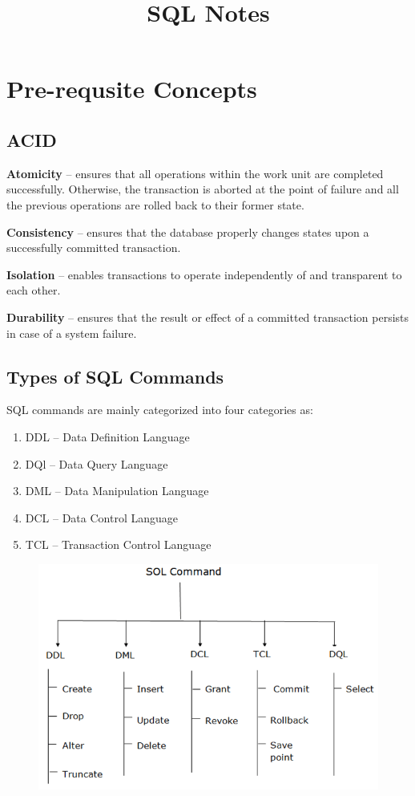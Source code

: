 \documentclass{article}
\title{\vspace{-3cm} SQL Notes}
\author{}
\date{}
\begin{document}
\maketitle
\vspace{-1.5cm}
\tableofcontents
\newpage

\section{Pre-requsite Concepts}

\subsection{ACID}
\textbf{Atomicity} -- ensures that all operations within the work unit are completed successfully. Otherwise, the transaction is aborted at the point of failure and all the previous operations are rolled back to their former state.

\textbf{Consistency} -- ensures that the database properly changes states upon a successfully committed transaction.

\textbf{Isolation} -- enables transactions to operate independently of and transparent to each other.

\textbf{Durability} -- ensures that the result or effect of a committed transaction persists in case of a system failure.


\subsection{Types of SQL Commands}
SQL commands are mainly categorized into four categories as:
\begin{enumerate}
    \item DDL -- Data Definition Language
    \item DQl -- Data Query Language
    \item DML -- Data Manipulation Language
    \item DCL -- Data Control Language
    \item TCL -- Transaction Control Language
\end{enumerate}

\begin{figure}[h]
    \centering
    \includegraphics[width=14cm]{dbms-sql-command.png}
\end{figure}
\end{document}

